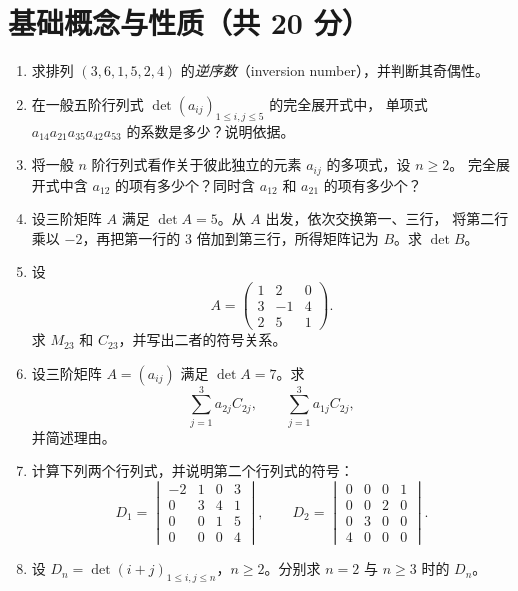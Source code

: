 \documentclass[UTF8,12pt,a4paper,fontset=fandol]{ctexart}
\begin{document}
\section{基础概念与性质（共 20 分）}
\begin{enumerate}[label=\arabic*.,series=detquestions]

\item\label{q:inversions}
求排列 $(3,6,1,5,2,4)$ 的\emph{逆序数}（inversion number），并判断其奇偶性。

\item\label{q:term-sign}
在一般五阶行列式 $\det(a_{ij})_{1\leq i,j\leq5}$ 的完全展开式中，
单项式 $a_{14}a_{21}a_{35}a_{42}a_{53}$ 的系数是多少？说明依据。

\item\label{q:count-terms}
将一般 $n$ 阶行列式看作关于彼此独立的元素 $a_{ij}$ 的多项式，设 $n\geq2$。
完全展开式中含 $a_{12}$ 的项有多少个？同时含 $a_{12}$ 和 $a_{21}$ 的项有多少个？

\item\label{q:row-operations}
设三阶矩阵 $A$ 满足 $\det A=5$。从 $A$ 出发，依次交换第一、三行，
将第二行乘以 $-2$，再把第一行的 $3$ 倍加到第三行，所得矩阵记为 $B$。求 $\det B$。

\item\label{q:minor-cofactor}
设
\[
A=\begin{pmatrix}1&2&0\\3&-1&4\\2&5&1\end{pmatrix}.
\]
求 $M_{23}$ 和 $C_{23}$，并写出二者的符号关系。

\item\label{q:cofactor-sums}
设三阶矩阵 $A=(a_{ij})$ 满足 $\det A=7$。求
\[
\sum_{j=1}^{3}a_{2j}C_{2j},\qquad
\sum_{j=1}^{3}a_{1j}C_{2j},
\]
并简述理由。

\item\label{q:triangular}
计算下列两个行列式，并说明第二个行列式的符号：
\[
D_1=\begin{vmatrix}-2&1&0&3\\0&3&4&1\\0&0&1&5\\0&0&0&4\end{vmatrix},
\qquad
D_2=\begin{vmatrix}0&0&0&1\\0&0&2&0\\0&3&0&0\\4&0&0&0\end{vmatrix}.
\]

\item\label{q:dependent-rows}
设 $D_n=\det(i+j)_{1\leq i,j\leq n}$，$n\geq2$。分别求 $n=2$ 与 $n\geq3$ 时的 $D_n$。


\end{enumerate}
\end{document}
